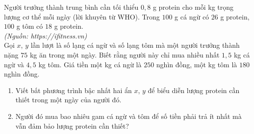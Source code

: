 \begin{bt}%
		Người trưởng thành trung bình cần tối thiểu $ 0{,}8 $ g protein cho mỗi kg trọng lượng cơ thể mỗi ngày (lời khuyên từ WHO). Trong $ 100 $ g cá ngừ có $ 26 $ g protein, $ 100 $ g tôm có $ 18 $ g protein.\\
		\textit{(Nguồn: https://ifitness.vn)}\\
		Gọi $ x $, $ y $ lần lượt là số lạng cá ngừ và số lạng tôm mà một người trưởng thành nặng $ 75 $ kg ăn trong một ngày. Biết rằng người này chỉ mua nhiều nhất $ 1{,}5 $ kg cá ngừ và $ 4{,}5 $ kg tôm. Giá tiền một kg cá ngừ là $ 250 $ nghìn đồng, một kg tôm là $ 180 $ nghìn đồng.
		\begin{enumerate}
			\item Viết bất phương trình bậc nhất hai ẩn $ x $, $ y $ để biểu diễn lượng protein cần thiết trong một ngày của người đó.
			\item Người đó mua bao nhiêu gam cá ngừ và tôm để số tiền phải trả ít nhất mà vẫn đảm bảo lượng protein cần thiết?
		\end{enumerate}
\end{bt}
